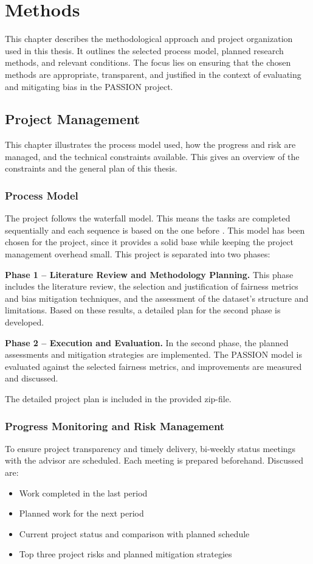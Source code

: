\documentclass[12pt, a4paper, oneside]{book}   	%
\begin{document}
	\chapter{Methods}\label{chap:methodology}
		This chapter describes the methodological approach and project organization used in this thesis. It outlines the selected process model, planned research methods, and relevant conditions. The focus lies on ensuring that the chosen methods are appropriate, transparent, and justified in the context of evaluating and mitigating bias in the PASSION project.
		
		\section{Project Management}
		This chapter illustrates the process model used, how the progress and risk are managed, and the technical constraints available. This gives an overview of the constraints and the general plan of this thesis. 
		
		\subsection{Process Model}
		The project follows the waterfall model. This means the tasks are completed sequentially and each sequence is based on the one before \autocite{Petersen_2009}. This model has been chosen for the project, since it provides a solid base while keeping the project management overhead small.
		This project is separated into two phases:
		
		\textbf{Phase 1 – Literature Review and Methodology Planning.} This phase includes the literature review, the selection and justification of fairness metrics and bias mitigation techniques, and the assessment of the dataset's structure and limitations. Based on these results, a detailed plan for the second phase is developed.
		
		\textbf{Phase 2 – Execution and Evaluation.} In the second phase, the planned assessments and mitigation strategies are implemented. The PASSION model is evaluated against the selected fairness metrics, and improvements are measured and discussed.
		
		The detailed project plan is included in the provided zip-file.
		
		\subsection{Progress Monitoring and Risk Management}
		To ensure project transparency and timely delivery, bi-weekly status meetings with the advisor are scheduled. Each meeting is prepared beforehand. Discussed are:
		\begin{itemize}
			\item Work completed in the last period
			\item Planned work for the next period
			\item Current project status and comparison with planned schedule
			\item Top three project risks and planned mitigation strategies
		\end{itemize}
		
\end{document}
